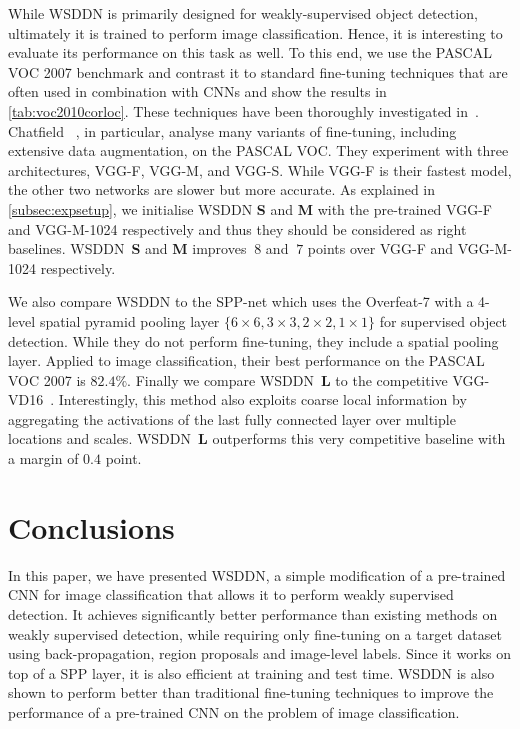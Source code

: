 \documentclass[10pt,twocolumn,letterpaper]{article}
\begin{document}
While WSDDN is primarily designed for weakly-supervised object detection, ultimately it is trained to perform image classification. Hence, it is interesting to evaluate its performance on this task as well. To this end, we use the PASCAL VOC 2007 benchmark and contrast it to standard fine-tuning techniques that are often used in combination with CNNs and show the results in \cref{tab:voc2010corloc}. These techniques have been thoroughly investigated in~\cite{Chatfield14,He14,Oquab14}. Chatfield \etal~\cite{Chatfield14}, in particular, analyse many variants of fine-tuning, including extensive data augmentation, on the PASCAL VOC. They experiment with three architectures, VGG-F, VGG-M, and VGG-S. While VGG-F is their fastest model, the other two networks are slower but more accurate. As explained in \ref{subsec:expsetup}, we initialise WSDDN \textbf{S} and \textbf{M} with the pre-trained VGG-F and VGG-M-1024 respectively and thus they should be considered as right baselines. WSDDN~\textbf{S} and \textbf{M} improves $~8$ and $~7$ points over VGG-F and VGG-M-1024 respectively. 


We also compare WSDDN to the SPP-net \cite{He14} which uses the Overfeat-7 \cite{Sermanet13} with a 4-level spatial pyramid pooling layer $\{6\times 6, 3\times 3, 2\times 2, 1\times 1\}$ for supervised object detection. While they do not perform fine-tuning, they include a spatial pooling layer. Applied to image classification, their best performance on the PASCAL VOC 2007 is $82.4\%$. Finally we compare WSDDN~\textbf{L} to the competitive VGG-VD16~\cite{Simonyan15}. Interestingly, this method also exploits coarse local information by aggregating the activations of the last fully connected layer over multiple locations and scales. WSDDN~\textbf{L} outperforms this very competitive baseline with a margin of $0.4$ point.



\section{Conclusions}\label{s:conclusions}
In this paper, we have presented WSDDN, a simple modification of a pre-trained CNN for image classification that allows it to perform weakly supervised detection. It achieves significantly better performance than existing methods on weakly supervised detection, while requiring only fine-tuning on a target dataset using back-propagation, region proposals and image-level labels. Since it works on top of a SPP layer, it is also efficient at training and test time. WSDDN is also shown to perform better than traditional fine-tuning techniques to improve the performance of a pre-trained CNN on the problem of image classification.
\end{document}
